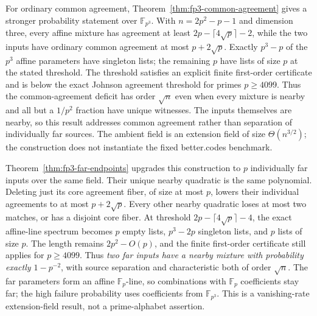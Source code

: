 \documentclass[11pt,letterpaper]{article}
\theoremstyle{definition}
\theoremstyle{remark}
\newcommand{\F}{\mathbb F}
\begin{document}
For ordinary common agreement, Theorem~\ref{thm:fp3-common-agreement}
gives a stronger probability statement over $\F_{p^3}$. With
$n=2p^2-p-1$ and dimension three, every affine mixture has agreement
at least $2p-\lceil4\sqrt p\rceil-2$, while the two inputs have
ordinary common agreement at most $p+2\sqrt p$.
Exactly $p^3-p$ of the $p^3$ affine parameters have singleton lists;
the remaining $p$ have lists of size $p$ at the stated threshold.
The threshold satisfies an explicit finite first-order certificate
and is below the exact Johnson agreement threshold for primes $p\ge4099$.
Thus the common-agreement deficit has order $\sqrt n$ even when
every mixture is nearby and all but a $1/p^2$ fraction have unique
witnesses. The inputs themselves are nearby, so this result addresses
common agreement rather than separation of individually far sources.
The ambient field is an extension field of size $\Theta(n^{3/2})$;
the construction does not instantiate the fixed better.codes benchmark.

Theorem~\ref{thm:fp3-far-endpoints} upgrades this construction to
$p$ individually far inputs over the same field. Their unique nearby
quadratic is the same polynomial. Deleting just its core agreement
fiber, of size at most $p$, lowers their individual agreements to at
most $p+2\sqrt p$. Every other nearby quadratic loses at most two
matches, or has a disjoint core fiber. At threshold
$2p-\lceil4\sqrt p\rceil-4$, the exact affine-line spectrum becomes
$p$ empty lists, $p^3-2p$ singleton lists, and $p$ lists of size $p$.
The length remains $2p^2-O(p)$, and the finite first-order certificate
still applies for $p\ge4099$. Thus \emph{two far inputs have a nearby
mixture with probability exactly $1-p^{-2}$}, with source separation
and characteristic both of order $\sqrt n$.
The far parameters form an affine $\F_p$-line, so combinations with
$\F_p$ coefficients stay far; the high failure probability uses
coefficients from $\F_{p^3}$. This is a vanishing-rate extension-field
result, not a prime-alphabet assertion.
\end{document}
